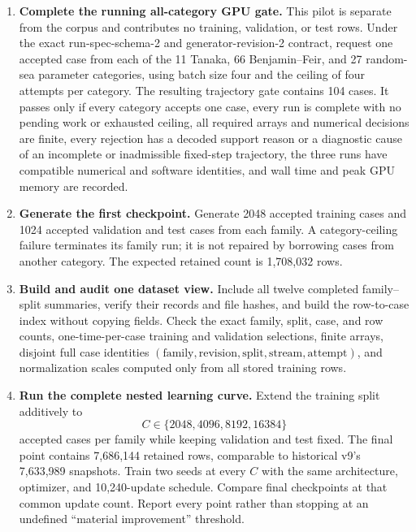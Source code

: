 \documentclass[11pt]{article}
\begin{document}
\begin{enumerate}
  \item \textbf{Complete the running all-category GPU gate.}
        This pilot is separate from the corpus and contributes no training,
        validation, or test rows.  Under the exact run-spec-schema-2 and
        generator-revision-2 contract, request
        one accepted case from each of the 11 Tanaka, 66 Benjamin--Feir, and
        27 random-sea parameter categories, using batch size four and the
        ceiling of four attempts per category.  The resulting trajectory gate
        contains 104 cases.  It passes only if every category accepts one
        case, every run is complete with no pending work or exhausted ceiling,
        all required arrays and numerical decisions are finite, every
        rejection has a decoded support reason or a diagnostic cause of an
        incomplete or inadmissible fixed-step trajectory,
        the three runs have compatible numerical and software identities, and
        wall time and peak GPU memory are recorded.

  \item \textbf{Generate the first checkpoint.}
        Generate 2048 accepted training cases and 1024 accepted validation
        and test cases from each family.  A category-ceiling failure terminates
its family run; it is not repaired by borrowing cases from another
        category.  The expected retained count is 1,708,032 rows.

  \item \textbf{Build and audit one dataset view.}
        Include all twelve completed family--split summaries, verify their
        records and file hashes, and build the row-to-case index without
        copying fields.  Check the exact family, split, case, and row counts,
        one-time-per-case training and validation selections, finite arrays,
        disjoint full case identities
        $(\text{family},\text{revision},\text{split},\text{stream},
        \text{attempt})$, and normalization scales computed only from all
        stored training rows.

  \item \textbf{Run the complete nested learning curve.}
        Extend the training split additively to
        \[
          C\in\{2048,4096,8192,16384\}
        \]
        accepted cases per family while keeping validation and test fixed.
        The final point contains 7,686,144 retained rows, comparable to
        historical v9's 7,633,989 snapshots.
        Train two seeds at every $C$ with the same architecture, optimizer,
        and 10,240-update schedule.  Compare final checkpoints at that common
        update count.  Report every point rather than stopping at an undefined
        ``material improvement'' threshold.


\end{enumerate}
\end{document}
